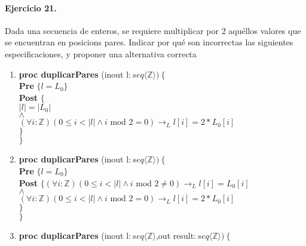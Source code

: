 \documentclass[a4paper]{article}
\begin{document}
	
\paragraph*{Ejercicio 21.} Dada una secuencia de enteros, se requiere multiplicar por 2 aquéllos valores que se encuentran en posicions pares. Indicar por qué son incorrectas las siguientes especificaciones, y proponer una alternativa correcta
	\begin{enumerate}[label=\alph*)]
		\item
			
			\textbf{proc duplicarPares }(inout l$: seq\langle \mathbb{Z}\rangle)\ \{$\smallskip \\
			\hspace*{6mm} \textbf{Pre }$\{ l=L_0\}$\smallskip \\
			\hspace*{6mm} \textbf{Post }$\{$\\
			\hspace*{6mm} $|l|=|L_0|$\\
			\hspace*{6mm} $\wedge$\\
			\hspace*{6mm} $(\forall i:\mathbb{Z})(0\leq i <|l|\wedge i \textrm{ mod }2=0)
							\rightarrow_L l[i]=2*L_0[i]$\\			
			\hspace*{6mm}$\}$\\
			$\}$
		\item
			\textbf{proc duplicarPares }(inout l$: seq\langle \mathbb{Z}\rangle)\ \{$\smallskip \\
			\hspace*{6mm} \textbf{Pre }$\{ l=L_0\}$\smallskip \\
			\hspace*{6mm} \textbf{Post }$\{(\forall i:\mathbb{Z})
					(0\leq i <|l|\wedge i \textrm{ mod }2\neq 0)
							\rightarrow_L l[i]=L_0[i]$\\
			\hspace*{6mm} $\wedge$\\
			\hspace*{6mm} $(\forall i:\mathbb{Z})(0\leq i <|l|\wedge i \textrm{ mod }2=0)
							\rightarrow_L l[i]=2*L_0[i]$\\				
			\hspace*{6mm}$\}$\\
			$\}$
		\item
			\textbf{proc duplicarPares }(inout l$: seq\langle \mathbb{Z}\rangle
				$,out result$:seq\langle \mathbb{Z}\rangle)\ \{$\smallskip \\

\end{enumerate}
\end{document}
